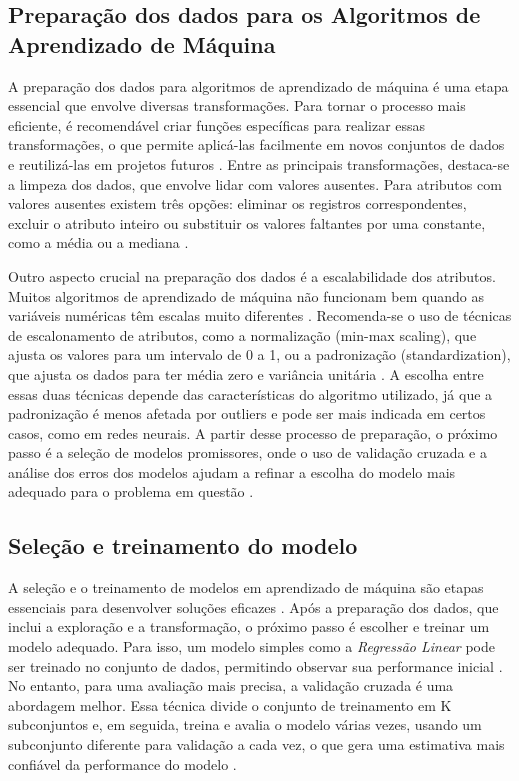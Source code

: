 \subsection{Preparação dos dados para os Algoritmos de Aprendizado de Máquina}
A preparação dos dados para algoritmos de aprendizado de máquina é uma etapa essencial que envolve diversas transformações. Para tornar o processo mais eficiente, é recomendável criar funções específicas para realizar essas transformações, o que permite aplicá-las facilmente em novos conjuntos de dados e reutilizá-las em projetos futuros \cite{geron2017}. Entre as principais transformações, destaca-se a limpeza dos dados, que envolve lidar com valores ausentes. Para atributos com valores ausentes existem três opções: eliminar os registros correspondentes, excluir o atributo inteiro ou substituir os valores faltantes por uma constante, como a média ou a mediana \cite{geron2017}. 

Outro aspecto crucial na preparação dos dados é a escalabilidade dos atributos. Muitos algoritmos de aprendizado de máquina não funcionam bem quando as variáveis numéricas têm escalas muito diferentes \cite{geron2017}. Recomenda-se o uso de técnicas de escalonamento de atributos, como a normalização (min-max scaling), que ajusta os valores para um intervalo de 0 a 1, ou a padronização (standardization), que ajusta os dados para ter média zero e variância unitária \cite{geron2017}. A escolha entre essas duas técnicas depende das características do algoritmo utilizado, já que a padronização é menos afetada por outliers e pode ser mais indicada em certos casos, como em redes neurais. A partir desse processo de preparação, o próximo passo é a seleção de modelos promissores, onde o uso de validação cruzada e a análise dos erros dos modelos ajudam a refinar a escolha do modelo mais adequado para o problema em questão \cite{geron2017}.

\subsection{Seleção e treinamento do modelo}
A seleção e o treinamento de modelos em aprendizado de máquina são etapas essenciais para desenvolver soluções eficazes \cite{geron2017}. Após a preparação dos dados, que inclui a exploração e a transformação, o próximo passo é escolher e treinar um modelo adequado. Para isso, um modelo simples como a \textit{Regressão Linear} pode ser treinado no conjunto de dados, permitindo observar sua performance inicial \cite{geron2017}. No entanto, para uma avaliação mais precisa, a validação cruzada é uma abordagem melhor. Essa técnica divide o conjunto de treinamento em K subconjuntos e, em seguida, treina e avalia o modelo várias vezes, usando um subconjunto diferente para validação a cada vez, o que gera uma estimativa mais confiável da performance do modelo \cite{geron2017}.

